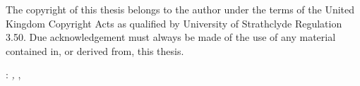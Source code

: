 \thispagestyle{empty}

\hfill
\bigskip

\noindent The copyright of this thesis belongs to the author under the terms of the United
Kingdom Copyright Acts as qualified by University of Strathclyde Regulation 3.50.
Due acknowledgement must always be made of the use of any material contained
in, or derived from, this thesis.

\vfill
\noindent\myName: \textit{\myTitle,} \mySubtitle, %
\textcopyright\ \myTime

%
%
%
%
%
